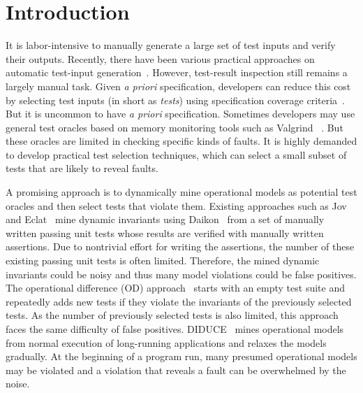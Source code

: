 \documentclass{sig-alternate}
\begin{document}



\section{Introduction} \label{sec:intro}

It is labor-intensive to manually generate a large set of test
inputs and verify their outputs. Recently, there have been various
practical approaches on automatic test-input
generation~\cite{Pacheco07, Sen05, Visser04}. However, test-result
inspection still remains a largely manual task. Given \emph{a
priori} specification, developers can reduce this cost by selecting
test inputs (in short as \emph{tests}) using specification coverage
criteria~\cite{Chang99}. But it is uncommon to have \emph{a priori}
specification. Sometimes developers may use general test oracles
based on memory monitoring tools such as Valgrind
~\cite{Nethercote07}. But these oracles are limited in checking
specific kinds of faults. It is highly demanded to develop practical
test selection techniques, which can select a small subset of tests
that are likely to reveal faults.


A promising approach is to dynamically mine operational models as
potential test oracles and then select tests that violate them.
Existing approaches such as Jov~\cite{Xie03} and
Eclat~\cite{Pacheco05} mine dynamic invariants using
Daikon~\cite{Ernst01} from a set of manually written passing unit
tests whose results are verified with manually written assertions.
Due to nontrivial effort for writing the assertions, the number of
these existing passing unit tests is often limited. Therefore, the
mined dynamic invariants could be noisy and thus many model
violations could be false positives. The operational difference (OD)
approach~\cite{Harder03} starts with an empty test suite and
repeatedly adds new tests if they violate the invariants of the
previously selected tests. As the number of previously selected
tests is also limited, this approach faces the same difficulty of
false positives. DIDUCE~\cite{Hangal02} mines operational models
from normal execution of long-running applications and relaxes the
models gradually. At the beginning of a program run, many presumed
operational models may be violated and a violation that reveals a
fault can be overwhelmed by the noise.
\end{document}
